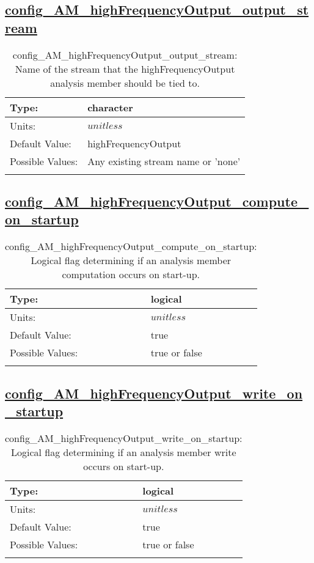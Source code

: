 \subsection[config\_AM\_highFrequencyOutput\_output\_stream]{\hyperref[sec:nm_tab_AM_highFrequencyOutput]{config\_AM\_highFrequencyOutput\_output\_stream}}
\label{subsec:nm_sec_config_AM_highFrequencyOutput_output_stream}
\begin{center}
\begin{longtable}{| p{2.0in} || p{4.0in} |}
    \hline
    Type: & character \\
    \hline
    Units: & $unitless$ \\
    \hline
    Default Value: & highFrequencyOutput \\
    \hline
    Possible Values: & Any existing stream name or 'none' \\
    \hline
    \caption{config\_AM\_highFrequencyOutput\_output\_stream: Name of the stream that the highFrequencyOutput analysis member should be tied to.}
\end{longtable}
\end{center}
\subsection[config\_AM\_highFrequencyOutput\_compute\_on\_startup]{\hyperref[sec:nm_tab_AM_highFrequencyOutput]{config\_AM\_highFrequencyOutput\_compute\_on\_startup}}
\label{subsec:nm_sec_config_AM_highFrequencyOutput_compute_on_startup}
\begin{center}
\begin{longtable}{| p{2.0in} || p{4.0in} |}
    \hline
    Type: & logical \\
    \hline
    Units: & $unitless$ \\
    \hline
    Default Value: & true \\
    \hline
    Possible Values: & true or false \\
    \hline
    \caption{config\_AM\_highFrequencyOutput\_compute\_on\_startup: Logical flag determining if an analysis member computation occurs on start-up.}
\end{longtable}
\end{center}
\subsection[config\_AM\_highFrequencyOutput\_write\_on\_startup]{\hyperref[sec:nm_tab_AM_highFrequencyOutput]{config\_AM\_highFrequencyOutput\_write\_on\_startup}}
\label{subsec:nm_sec_config_AM_highFrequencyOutput_write_on_startup}
\begin{center}
\begin{longtable}{| p{2.0in} || p{4.0in} |}
    \hline
    Type: & logical \\
    \hline
    Units: & $unitless$ \\
    \hline
    Default Value: & true \\
    \hline
    Possible Values: & true or false \\
    \hline
    \caption{config\_AM\_highFrequencyOutput\_write\_on\_startup: Logical flag determining if an analysis member write occurs on start-up.}
\end{longtable}
\end{center}

